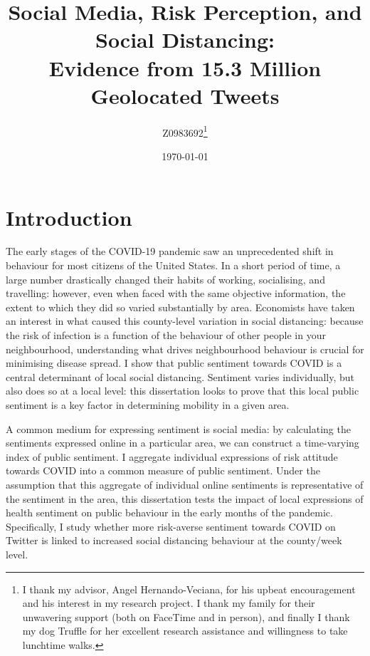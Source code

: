 \documentclass{article}
\author{Z0983692\thanks{I thank my advisor, Angel Hernando-Veciana, for his upbeat encouragement and his interest in my research project. I thank my family for their unwavering support (both on FaceTime and in person), and finally I thank my dog Truffle for her excellent research assistance and willingness to take lunchtime walks.}}
\date{\today}
\newcommand\wordcount{}
\begin{document}
\title{Social Media, Risk Perception, and Social Distancing: \\ Evidence from 15.3 Million Geolocated Tweets}

\maketitle

\wordcount


\newpage
\begin{onehalfspace}
\tableofcontents
\end{onehalfspace}
\newpage
\section{Introduction}\label{overview}

The early stages of the COVID-19 pandemic saw an unprecedented shift in behaviour for most citizens of the United States. In a short period of time, a large number drastically changed their habits of working, socialising, and travelling: however, even when faced with the same objective information, the extent to which they did so varied substantially by area. Economists have taken an interest in what caused this county-level variation in social distancing: because the risk of infection is a function of the behaviour of other people in your neighbourhood, understanding what drives neighbourhood behaviour is crucial for minimising disease spread. I show that public sentiment towards COVID is a central determinant of local social distancing. Sentiment varies individually, but also does so at a local level: this dissertation looks to prove that this local public sentiment is a key factor in determining mobility in a given area. 

A common medium for expressing sentiment is social media: by calculating the sentiments expressed online in a particular area, we can construct a time-varying index of public sentiment. I aggregate individual expressions of risk attitude towards COVID into a common measure of public sentiment. Under the assumption that this aggregate of individual online sentiments is representative of the sentiment in the area, this dissertation tests the impact of local expressions of health sentiment on public behaviour in the early months of the pandemic. Specifically, I study whether more risk-averse sentiment towards COVID on Twitter is linked to increased social distancing behaviour at the county/week level. 
\end{document}
